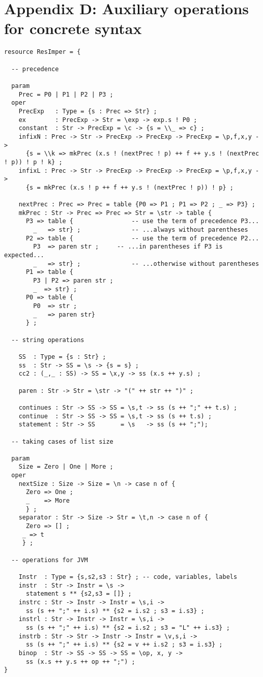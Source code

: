 \documentclass[12pt]{article}
\begin{document}
\section*{Appendix D: Auxiliary operations for concrete syntax}

\small
\begin{verbatim}
resource ResImper = {

  -- precedence

  param
    Prec = P0 | P1 | P2 | P3 ;
  oper
    PrecExp   : Type = {s : Prec => Str} ;
    ex        : PrecExp -> Str = \exp -> exp.s ! P0 ;
    constant  : Str -> PrecExp = \c -> {s = \\_ => c} ;
    infixN : Prec -> Str -> PrecExp -> PrecExp -> PrecExp = \p,f,x,y ->
      {s = \\k => mkPrec (x.s ! (nextPrec ! p) ++ f ++ y.s ! (nextPrec ! p)) ! p ! k} ;
    infixL : Prec -> Str -> PrecExp -> PrecExp -> PrecExp = \p,f,x,y ->
      {s = mkPrec (x.s ! p ++ f ++ y.s ! (nextPrec ! p)) ! p} ;

    nextPrec : Prec => Prec = table {P0 => P1 ; P1 => P2 ; _ => P3} ;
    mkPrec : Str -> Prec => Prec => Str = \str -> table {
      P3 => table {                -- use the term of precedence P3...
        _   => str} ;              -- ...always without parentheses
      P2 => table {                -- use the term of precedence P2...
        P3  => paren str ;     -- ...in parentheses if P3 is expected...
        _   => str} ;              -- ...otherwise without parentheses
      P1 => table {
        P3 | P2 => paren str ;
        _  => str} ;
      P0 => table {
        P0  => str ;
        _   => paren str}
      } ;

  -- string operations

    SS  : Type = {s : Str} ;
    ss  : Str -> SS = \s -> {s = s} ;
    cc2 : (_,_ : SS) -> SS = \x,y -> ss (x.s ++ y.s) ;

    paren : Str -> Str = \str -> "(" ++ str ++ ")" ;

    continues : Str -> SS -> SS = \s,t -> ss (s ++ ";" ++ t.s) ; 
    continue  : Str -> SS -> SS = \s,t -> ss (s ++ t.s) ;
    statement : Str -> SS       = \s   -> ss (s ++ ";"); 

  -- taking cases of list size

  param
    Size = Zero | One | More ;
  oper
    nextSize : Size -> Size = \n -> case n of {
      Zero => One ;
      _    => More
      } ;
    separator : Str -> Size -> Str = \t,n -> case n of {
      Zero => [] ;
     _ => t
     } ;

  -- operations for JVM

    Instr  : Type = {s,s2,s3 : Str} ; -- code, variables, labels
    instr  : Str -> Instr = \s -> 
      statement s ** {s2,s3 = []} ;
    instrc : Str -> Instr -> Instr = \s,i -> 
      ss (s ++ ";" ++ i.s) ** {s2 = i.s2 ; s3 = i.s3} ;
    instrl : Str -> Instr -> Instr = \s,i -> 
      ss (s ++ ";" ++ i.s) ** {s2 = i.s2 ; s3 = "L" ++ i.s3} ;
    instrb : Str -> Str -> Instr -> Instr = \v,s,i -> 
      ss (s ++ ";" ++ i.s) ** {s2 = v ++ i.s2 ; s3 = i.s3} ;
    binop  : Str -> SS -> SS -> SS = \op, x, y ->
      ss (x.s ++ y.s ++ op ++ ";") ;
}
\end{verbatim}
\normalsize
\newpage
\end{document}
